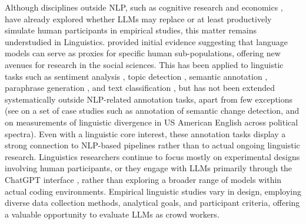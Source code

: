 Although disciplines outside NLP, such as cognitive research \citep{dillion_can_2023} and economics \citep{gui_challenge_2023}, have already explored whether LLMs may replace or at least productively simulate human participants in empirical studies, this matter remains understudied in Linguistics. \citep{Argyle_2023} provided initial evidence suggesting that language models can serve as proxies for specific human sub-populations, offering new avenues for research in the social sciences. This has been applied to linguistic tasks such as sentiment analysis \citep{borst_death_2023, rebora_comparing_2023}, topic detection \citep{kosar_comparative_2024}, semantic annotation \citep{gilardi_chatgpt_2023}, paraphrase generation \citep{cegin_chatgpt_2023}, and text classification \citep{de_lange_benchmarking_2024}, but has not been extended systematically outside NLP-related annotation tasks, apart from few exceptions (see \citep{karjus2024machineassisted} on a set of case studies such as annotation of semantic change detection, and \citep{Karjus2024-zg} on measurements of linguistic divergence in US American English across political spectra). Even with a linguistic core interest, these annotation tasks display a strong connection to NLP-based pipelines rather than to actual ongoing linguistic research. Linguistics researchers continue to focus mostly on experimental designs involving human participants, or they engage with LLMs primarily through the ChatGPT interface \citep{dynel_lessons_2023, han_chatgpt_2024, duncan_does_2024}, rather than exploring a broader range of models within actual coding environments. Empirical linguistic studies vary in design, employing diverse data collection methods, analytical goals, and participant criteria, offering a valuable opportunity to evaluate LLMs as crowd workers.